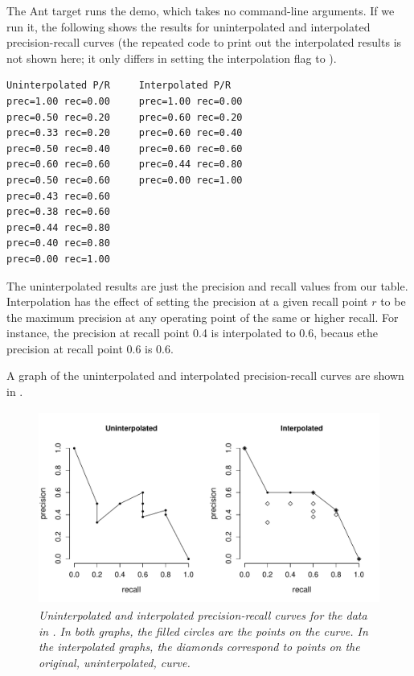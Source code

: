 The Ant target  runs the demo, which
takes no command-line arguments.  If we run it, the following shows
the results for uninterpolated and interpolated precision-recall
curves (the repeated code to print out the interpolated results
is not shown here; it only differs in setting the interpolation
flag to ).
%
\begin{verbatim}
Uninterpolated P/R     Interpolated P/R
prec=1.00 rec=0.00     prec=1.00 rec=0.00
prec=0.50 rec=0.20     prec=0.60 rec=0.20
prec=0.33 rec=0.20     prec=0.60 rec=0.40
prec=0.50 rec=0.40     prec=0.60 rec=0.60
prec=0.60 rec=0.60     prec=0.44 rec=0.80
prec=0.50 rec=0.60     prec=0.00 rec=1.00
prec=0.43 rec=0.60
prec=0.38 rec=0.60
prec=0.44 rec=0.80
prec=0.40 rec=0.80
prec=0.00 rec=1.00
\end{verbatim}
%
The uninterpolated results are just the precision and recall values
from our table.  Interpolation has the effect of setting the precision
at a given recall point $r$ to be the maximum precision at any
operating point of the same or higher recall.  For instance, the
precision at recall point 0.4 is interpolated to 0.6, becaus ethe
precision at recall point 0.6 is 0.6.

A graph of the uninterpolated and interpolated precision-recall
curves are shown in .
%
\begin{figure}
\begin{center}
\includegraphics[height=2.5in]{pdfs/pr-curves.pdf}
\vspace*{-24pt}
\end{center}
\caption{\it Uninterpolated and interpolated precision-recall curves
  for the data in .  In both graphs, the filled
  circles are the points on the curve.  In the interpolated graphs,
  the diamonds correspond to points on the original, uninterpolated,
  curve.}\label{fig:pr-curves}
\end{figure}



